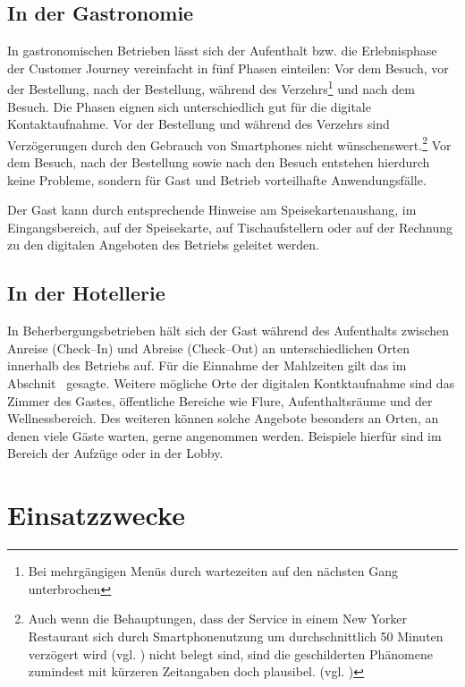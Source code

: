 \subsection{In der Gastronomie} %
\label{sub:gastronomie}
In gastronomischen Betrieben lässt sich der Aufenthalt bzw. die Erlebnisphase der Customer Journey vereinfacht in fünf Phasen einteilen: Vor dem Besuch, vor der Bestellung, nach der Bestellung, während des Verzehrs\footnote{Bei mehrgängigen Menüs durch wartezeiten auf den nächsten Gang unterbrochen} und nach dem Besuch. Die Phasen eignen sich unterschiedlich gut für die digitale Kontaktaufnahme.  Vor der Bestellung und während des Verzehrs sind Verzögerungen durch den Gebrauch von Smartphones nicht wünschenswert.\footnote{Auch wenn die Behauptungen, dass der Service in einem New Yorker Restaurant sich durch Smartphonenutzung um durchschnittlich 50 Minuten verzögert wird (vgl. \cite{craiglist:slow}) nicht belegt sind, sind die geschilderten Phänomene zumindest mit kürzeren Zeitangaben doch plausibel. (vgl. \cite{craiglist:fake})} Vor dem Besuch, nach der Bestellung sowie nach den Besuch entstehen hierdurch keine Probleme, sondern für Gast und Betrieb vorteilhafte Anwendungsfälle. 

Der Gast kann durch entsprechende Hinweise am Speisekartenaushang, im Eingangsbereich, auf der Speisekarte, auf Tischaufstellern oder auf der Rechnung zu den digitalen Angeboten des Betriebs geleitet werden.

\subsection{In der Hotellerie} %
\label{sub:hotellerie}
In Beherbergungsbetrieben hält sich der Gast während des Aufenthalts zwischen Anreise (Check–In) und Abreise (Check–Out) an unterschiedlichen Orten innerhalb des Betriebs auf. Für die Einnahme der Mahlzeiten gilt das im Abschnit~ gesagte. Weitere mögliche Orte der digitalen Kontktaufnahme sind das Zimmer des Gastes, öffentliche Bereiche wie Flure, Aufenthaltsräume und der Wellnessbereich. Des weiteren können solche Angebote besonders an Orten, an denen viele Gäste warten, gerne angenommen werden. Beispiele hierfür sind im Bereich der Aufzüge oder in der Lobby.




\newpage
{}
\section{Einsatzzwecke} %
\label{sec:einsatzzwecke}

